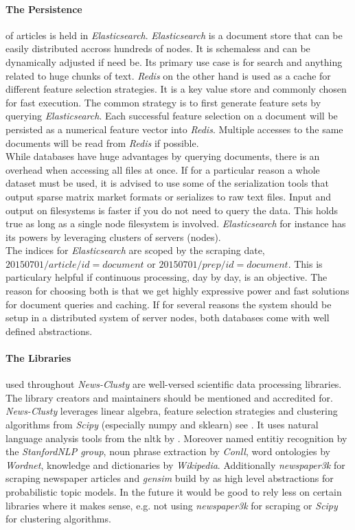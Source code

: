   \paragraph{The Persistence} of articles is held in \emph{Elasticsearch}. \emph{Elasticsearch} is a document store that can be easily distributed accross hundreds of nodes. It is schemaless and can be dynamically adjusted if need be. Its primary use case is for search and anything related to huge chunks of text. \emph{Redis} on the other hand is used as a cache for different feature selection strategies. It is a key value store and commonly chosen for fast execution. The common strategy is to first generate feature sets by querying \emph{Elasticsearch}. Each successful feature selection on a document will be persisted as a numerical feature vector into \emph{Redis}. Multiple accesses to the same documents will be read from \emph{Redis} if possible.\\
  While databases have huge advantages by querying documents, there is an overhead when accessing all files at once. If for a particular reason a whole dataset must be used, it is advised to use some of the serialization tools that output sparse matrix market formats or serializes to raw text files. Input and output on filesystems is faster if you do not need to query the data. This holds true as long as a single node filesystem is involved. \emph{Elasticsearch} for instance has its powers by leveraging clusters of servers (nodes).\\ 
  The indices for \emph{Elasticsearch} are scoped by the scraping date, $20150701/article/id = document$ or $20150701/prep/id = document$. This is particulary helpful if continuous processing, day by day, is an objective. The reason for choosing both is that we get highly expressive power and fast solutions for document queries and caching. If for several reasons the system should be setup in a distributed system of server nodes, both databases come with well defined abstractions.

  \paragraph{The Libraries} used throughout \emph{News-Clusty} are well-versed scientific data processing libraries. The library creators and maintainers should be mentioned and accredited for. \emph{News-Clusty} leverages linear algebra, feature selection strategies and clustering algorithms from \emph{Scipy} (especially numpy and sklearn) see \cite{ScikitLearn}. It uses natural language analysis tools from the nltk by \cite{NltkPython}. Moreover named entitiy recognition by the \emph{StanfordNLP group}, noun phrase extraction by \emph{Conll}, word ontologies by \emph{Wordnet}, knowledge and dictionaries by \emph{Wikipedia}. Additionally \emph{newspaper3k} for scraping newspaper articles and \emph{gensim} build by \cite{gensim2010} as high level abstractions for probabilistic topic models. In the future it would be good to rely less on certain libraries where it makes sense, e.g. not using \emph{newspaper3k} for scraping or \emph{Scipy} for clustering algorithms.



